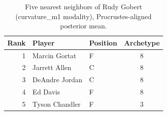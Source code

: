 \begin{table}[htbp]
  \centering\small
  \begin{tabular}{rllc}
    \toprule
    Rank & Player & Position & Archetype \\
    \midrule
    1 & Marcin Gortat & F & 8 \\
    2 & Jarrett Allen & C & 8 \\
    3 & DeAndre Jordan & C & 8 \\
    4 & Ed Davis & F & 8 \\
    5 & Tyson Chandler & F & 3 \\
    \bottomrule
  \end{tabular}
  \caption{Five nearest neighbors of Rudy Gobert (curvature_m1 modality), Procrustes-aligned posterior mean.}
  \label{tab:Rudy_Gobert_neighbors_curvature_m1}
\end{table}

